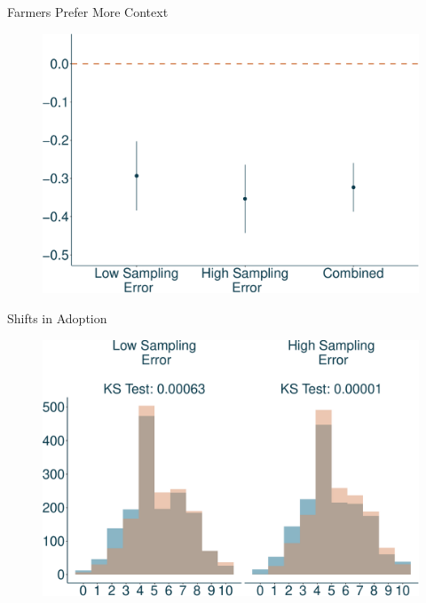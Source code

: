 \documentclass[
  ignorenonframetext,
]{beamer}
\begin{document}
\begin{frame}{Farmers Prefer More Context}
\protect\hypertarget{farmers-prefer-more-context}{}
\begin{figure}

{\centering \includegraphics{presentation_lori_files/figure-beamer/unnamed-chunk-3-1.pdf}

}

\end{figure}

\begin{block}{Shifts in Adoption}
\protect\hypertarget{shifts-in-adoption}{}
\begin{figure}

{\centering \includegraphics{presentation_lori_files/figure-beamer/unnamed-chunk-4-1.pdf}

}

\end{figure}
\end{block}
\end{frame}
\end{document}
